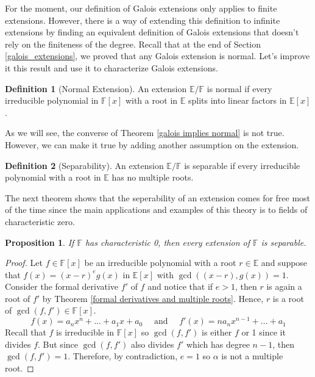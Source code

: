 \documentclass{article}
\theoremstyle{plain}
\newtheorem{proposition}[theorem]{Proposition}
\theoremstyle{definition}
\newtheorem*{definition}{Definition}
\newcommand{\F}{\mathbb{F}}
\newcommand{\E}{\mathbb{E}}
\begin{document}
For the moment, our definition of Galois extensions only applies to finite extensions. However, there is a way of extending this definition to infinite extensions by finding an equivalent definition of Galois extensions that doesn't rely on the finiteness of the degree. Recall that at the end of Section \ref{galois_extensions}, we proved that any Galois extension is normal. Let's improve it this result and use it to characterize Galois extensions.

\begin{definition}[Normal Extension]
    An extension $\E / \F$ is normal if every irreducible polynomial in $\F[x]$ with a root in $\E$ splits into linear factors in $\E[x]$.
\end{definition}

As we will see, the converse of Theorem \ref{galois implies normal} is not true. However, we can make it true by adding another assumption on the extension.

\begin{definition}[Separability]
    An extension $\E / \F$ is separable if every irreducible polynomial with a root in $\E$ has no multiple roots.
\end{definition}

The next theorem shows that the seperability of an extension comes for free most of the time since the main applications and examples of this theory is to fields of characteristic zero.

\begin{proposition}
    If $\F$ has characteristic 0, then every extension of $\F$ is separable.
\end{proposition}

\begin{proof}
    Let $f \in \F[x]$ be an irreducible polynomial with a root $r \in \E$ and suppose that $f(x) = (x - r)^eg(x)$ in $\E[x]$ with $\gcd((x - r), g(x)) = 1$. Consider the formal derivative $f'$ of $f$ and notice that if $e > 1$, then $r$ is again a root of $f'$ by Theorem \ref{formal derivatives and multiple roots}. Hence, $r$ is a root of $\gcd(f, f') \in \F[x]$.
    $$f(x) = a_n x^n + ... + a_1x + a_0 \quad \text{ and } \quad f'(x) = na_n x^{n-1} + ... + a_1$$
    Recall that $f$ is irreducible in $\F[x]$ so $\gcd(f,f')$ is either $f$ or 1 since it divides $f$. But since $\gcd(f,f')$ also divides $f'$ which has degree $n-1$, then $\gcd(f,f') = 1$. Therefore, by contradiction, $e = 1$ so $\alpha$ is not a multiple root.
\end{proof}
\end{document}
